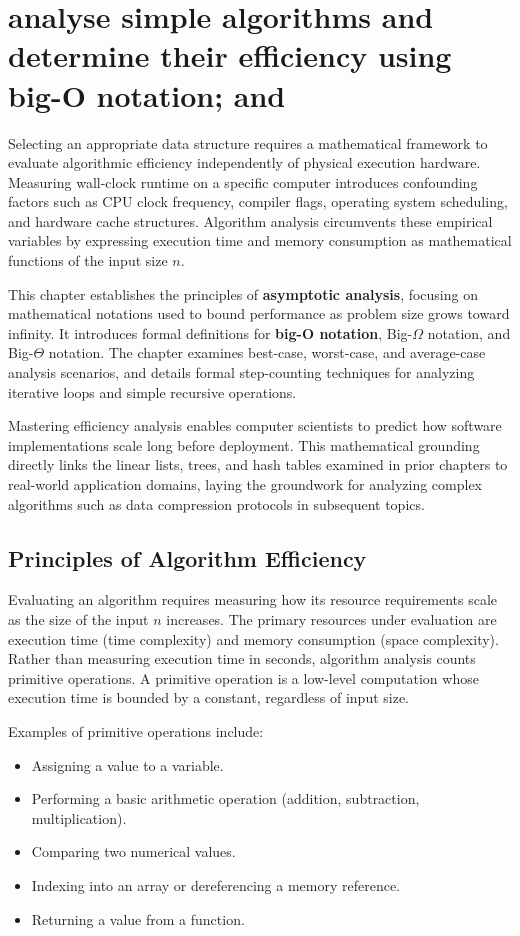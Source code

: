 \documentclass[12pt]{report}
\begin{document}
\pagestyle{plain}
\setcounter{page}{39}
\setcounter{chapter}{4}
\chapter{analyse simple algorithms and determine their efficiency using big-O notation; and}

Selecting an appropriate data structure requires a mathematical framework to evaluate algorithmic efficiency independently of physical execution hardware. Measuring wall-clock runtime on a specific computer introduces confounding factors such as CPU clock frequency, compiler flags, operating system scheduling, and hardware cache structures. Algorithm analysis circumvents these empirical variables by expressing execution time and memory consumption as mathematical functions of the input size $n$.

This chapter establishes the principles of \textbf{asymptotic analysis}, focusing on mathematical notations used to bound performance as problem size grows toward infinity. It introduces formal definitions for \textbf{big-O notation}, Big-$\Omega$ notation, and Big-$\Theta$ notation. The chapter examines best-case, worst-case, and average-case analysis scenarios, and details formal step-counting techniques for analyzing iterative loops and simple recursive operations.

Mastering efficiency analysis enables computer scientists to predict how software implementations scale long before deployment. This mathematical grounding directly links the linear lists, trees, and hash tables examined in prior chapters to real-world application domains, laying the groundwork for analyzing complex algorithms such as data compression protocols in subsequent topics.

\section{Principles of Algorithm Efficiency}

Evaluating an algorithm requires measuring how its resource requirements scale as the size of the input $n$ increases. The primary resources under evaluation are execution time (time complexity) and memory consumption (space complexity). Rather than measuring execution time in seconds, algorithm analysis counts primitive operations. A primitive operation is a low-level computation whose execution time is bounded by a constant, regardless of input size.

Examples of primitive operations include:
\begin{itemize}
    \item Assigning a value to a variable.
    \item Performing a basic arithmetic operation (addition, subtraction, multiplication).
    \item Comparing two numerical values.
    \item Indexing into an array or dereferencing a memory reference.
    \item Returning a value from a function.
\end{itemize}
\end{document}
